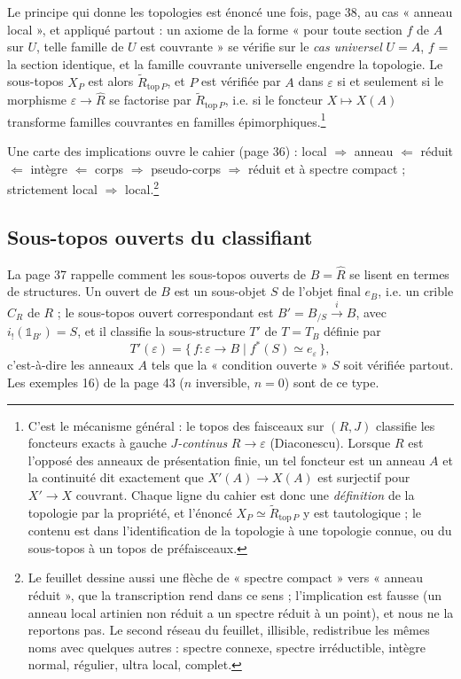 \documentclass[11pt,a4paper]{article}
\begin{document}
Le principe qui donne les topologies est énoncé une fois, page 38, au cas
« anneau local », et appliqué partout : un axiome de la forme « pour toute
section $f$ de $A$ sur $U$, telle famille de $U$ est couvrante » se vérifie
sur le \emph{cas universel} $U = A$, $f$ = la section identique, et la
famille couvrante universelle engendre la topologie. Le sous-topos $X_{P}$
est alors $\widetilde{R}_{\mathrm{top}\,P}$, et $P$ est vérifiée par $A$
dans $\varepsilon$ si et seulement si le morphisme $\varepsilon \to
\widehat{R}$ se factorise par $\widetilde{R}_{\mathrm{top}\,P}$, i.e. si le
foncteur $X \mapsto X(A)$ transforme familles couvrantes en familles
épimorphiques.\footnote{C'est le mécanisme général : le topos des
faisceaux sur $(R, J)$ classifie les foncteurs exacts à gauche
\emph{$J$-continus} $R \to \varepsilon$ (Diaconescu). Lorsque $R$ est
l'opposé des anneaux de présentation finie, un tel foncteur est un anneau
$A$ et la continuité dit exactement que $X'(A) \to X(A)$ est surjectif pour
$X' \to X$ couvrant. Chaque ligne du cahier est donc une \emph{définition}
de la topologie par la propriété, et l'énoncé $X_{P} \simeq \widetilde{R}
_{\mathrm{top}\,P}$ y est tautologique ; le contenu est dans
l'identification de la topologie à une topologie connue, ou du sous-topos à
un topos de préfaisceaux.}

Une carte des implications ouvre le cahier (page 36) : local $\Rightarrow$
anneau $\Leftarrow$ réduit $\Leftarrow$ intègre $\Leftarrow$ corps
$\Rightarrow$ pseudo-corps $\Rightarrow$ réduit et à spectre compact ;
strictement local $\Rightarrow$ local.\footnote{Le feuillet dessine aussi
une flèche de « spectre compact » vers « anneau réduit », que la
transcription rend dans ce sens ; l'implication est fausse (un anneau
local artinien non réduit a un spectre réduit à un point), et nous ne la
reportons pas. Le second réseau du feuillet, illisible, redistribue les
mêmes noms avec quelques autres : spectre connexe, spectre irréductible,
intègre normal, régulier, ultra local, complet.}

\subsection*{Sous-topos ouverts du classifiant}

La page 37 rappelle comment les sous-topos ouverts de $B = \widehat{R}$ se
lisent en termes de structures. Un ouvert de $B$ est un sous-objet $S$ de
l'objet final $e_{B}$, i.e. un crible $C_{R}$ de $R$ ; le sous-topos ouvert
correspondant est $B' = B_{/S} \xrightarrow{i} B$, avec $i_{!}(\mathbb{1}
_{B'}) = S$, et il classifie la sous-structure $T'$ de $T = T_{B}$ définie
par
\[
T'(\varepsilon) = \{\, f : \varepsilon \to B \mid f^{*}(S) \simeq
e_{\varepsilon} \,\},
\]
c'est-à-dire les anneaux $A$ tels que la « condition ouverte » $S$ soit
vérifiée partout. Les exemples 16) de la page 43 ($n$ inversible, $n =
0$) sont de ce type.
\end{document}
